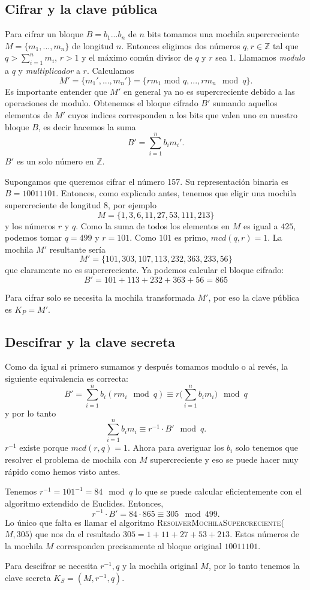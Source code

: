 \documentclass[12pt]{article}
\newcommand{\Z}{\mathbb{Z}}
\newenvironment{example}[1][Ejemplo]{\begin{trivlist}
\item[\hskip \labelsep {\bfseries #1}]}{\end{trivlist}}
\begin{document}
\subsection*{Cifrar y la clave pública}

Para cifrar un bloque $B = b_1...b_n$ de $n$ bits tomamos una mochila supercreciente $M = \{m_1, ..., m_n\}$ de longitud $n$. Entonces eligimos dos números $q, r \in \Z$ tal que $q > \sum_{i=1}^nm_i$, $r > 1$ y el máximo común divisor de $q$ y $r$ sea $1$. Llamamos \emph{modulo} a $q$ y \emph{multiplicador} a $r$. Calculamos
$$M' = \{m_1', ..., m_n'\} = \{r m_1 \text{ mod } q, ..., r m_n \mod q\}.$$
Es importante entender que $M'$ en general ya no es supercreciente debido a las operaciones de modulo. Obtenemos el bloque cifrado $B'$ sumando aquellos elementos de $M'$ cuyos indices corresponden a los bits que valen uno en nuestro bloque $B$, es decir hacemos la suma
$$B' = \sum_{i=1}^nb_im_i'.$$
$B'$ es un solo número en $\Z$.

\begin{example}
Supongamos que queremos cifrar el número 157. Su representación binaria es $B = 10011101$. Entonces, como explicado antes, tenemos que eligir una mochila supercreciente de longitud $8$, por ejemplo
$$M = \{1, 3, 6, 11, 27, 53, 111, 213\}$$
y los números $r$ y $q$. Como la suma de todos los elementos en $M$ es igual a $425$, podemos tomar $q = 499$ y $r = 101$. Como $101$ es primo, $mcd(q,r) = 1$. La mochila $M'$ resultante sería
$$M' = \{101, 303, 107, 113, 232, 363, 233, 56\}$$
que claramente no es supercreciente. Ya podemos calcular el bloque cifrado:
$$B' = 101 + 113 + 232 + 363 + 56 = 865$$
\end{example}
Para cifrar solo se necesita la mochila transformada $M'$, por eso la clave pública es $K_P = M'$.

\subsection*{Descifrar y la clave secreta}
Como da igual si primero sumamos y después tomamos modulo o al revés, la siguiente equivalencia es correcta:
$$B' = \sum_{i=1}^nb_i(rm_i \mod q) \equiv r\big(\sum_{i=1}^nb_im_i\big)\mod q$$
y por lo tanto
$$\sum_{i=1}^nb_im_i \equiv r^{-1} \cdot B' \mod q.$$
$r^{-1}$ existe porque $mcd(r,q) = 1$. Ahora para averiguar los $b_i$ solo tenemos que resolver el problema de mochila con $M$ supercreciente y eso se puede hacer muy rápido como hemos visto antes.

\begin{example}
Tenemos $r^{-1} = 101^{-1}= 84 \mod q$ lo que se puede calcular eficientemente con el algoritmo extendido de Euclides. Entonces,
$$r^{-1} \cdot B' = 84 \cdot 865 \equiv 305 \mod 499.$$
Lo único que falta es llamar el algoritmo \textsc{ResolverMochilaSupercreciente}($M, 305$) que nos da el resultado $305 = 1 + 11 + 27 + 53 + 213$. Estos números de la mochila $M$ corresponden precisamente al bloque original $10011101$.
\end{example}
Para descifrar se necesita $r^{-1}, q$ y la mochila original $M$, por lo tanto tenemos la clave secreta $K_S = (M, r^{-1}, q)$.
\end{document}
